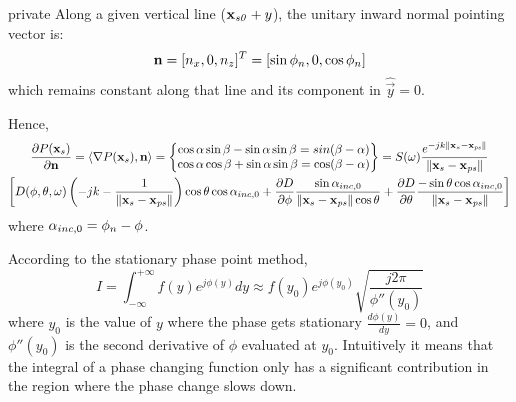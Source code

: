 \begin{shownto}{private}
Along a given vertical line ($\PosTheo[section] + y$), the unitary inward normal pointing vector is:
\begin{equation}
\mathbf{n} = [n_x, 0, n_z]^T = [\sin\phi_n, 0, \cos\phi_n]
\end{equation}
which remains constant along that line and its component in $\hat{\vec{y}} = 0$.

Hence,
\begin{multline}
	\frac{\partial P(\PosTheo[surface])}{\partial \mathbf{n}} = \langle \nabla P(\PosTheo[surface]), \vec{n} \rangle = \left\{
	\begin{matrix}
		\cos\alpha \sin\beta - \sin\alpha \sin\beta = sin(\beta - \alpha) \\ \cos\alpha \cos\beta + \sin\alpha\sin\beta = \cos(\beta - \alpha)
	\end{matrix}  \right\}
	= S(\omega) \GreenFunc[{\PosTheo[surface] - \PosTheo[primarySource]}] \\ \left[ D(\azimuth, \elevation, \omega) \left(-jk - \frac{1}{\norm{\PosTheo[surface] - \PosTheo[primarySource]}}\right) \cos\elevation \cos\normPrimaryPropAngleSection + \frac{\partial D}{\partial \azimuth} \frac{\sin \normPrimaryPropAngleSection}{\norm{\PosTheo[surface] - \PosTheo[primarySource]} \cos \elevation} + \frac{\partial D}{\partial \elevation} \frac{-\sin\elevation \cos\normPrimaryPropAngleSection}{\norm{\PosTheo[surface] - \PosTheo[primarySource]}}  \right]
	\label{directDerivField}
\end{multline}
where $\alpha_{inc,0} = \phi_n - \phi$.

According to the stationary phase point method,
\begin{equation}
I = \int_{-\infty}^{+\infty} f(y) e^{j\phi(y)} dy \approx f(y_0) e^{j\phi(y_0)} \sqrt{\frac{j 2\pi}{\phi''(y_0)}}
\end{equation}
where $y_0$ is the value of $y$ where the phase gets stationary $\frac{d\phi(y)}{dy} = 0$, and $\phi''(y_0)$ is the second derivative of $\phi$ evaluated at $y_0$. Intuitively it means that the integral of a phase changing function only has a significant contribution in the region where the phase change slows down.


\end{shownto}

